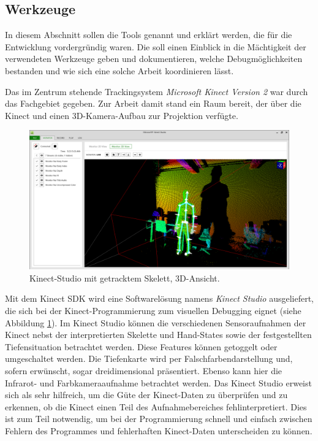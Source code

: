 	\subsection{Werkzeuge}
	In diesem Abschnitt sollen die Tools genannt und erklärt werden, die für die Entwicklung vordergründig waren. Die soll einen Einblick in die Mächtigkeit der verwendeten Werkzeuge geben und dokumentieren, welche Debugmöglichkeiten bestanden und wie sich eine solche Arbeit koordinieren lässt.\par
	Das im Zentrum stehende Trackingsystem \emph{Microsoft Kinect Version 2} war durch das Fachgebiet gegeben. Zur Arbeit damit stand ein Raum bereit, der über die Kinect und einen 3D-Kamera-Aufbau zur Projektion verfügte.\par 
		\begin{figure}[H]
	\centering
	\includegraphics[width=\textwidth]{pictures/3d.png}
	\caption{Kinect-Studio mit getracktem Skelett, 3D-Ansicht.}\label{fig:studio}
	\end{figure}
	Mit dem Kinect SDK wird eine Softwarelösung namens \emph{Kinect Studio} ausgeliefert, die sich bei der Kinect-Programmierung zum visuellen Debugging eignet (siehe Abbildung \ref{fig:studio}). Im Kinect Studio können die verschiedenen Sensoraufnahmen der Kinect nebst der interpretierten Skelette und Hand-States sowie der festgestellten Tiefensituation betrachtet werden. Diese Features können getoggelt oder umgeschaltet werden. Die Tiefenkarte wird per Falschfarbendarstellung und, sofern erwünscht, sogar dreidimensional präsentiert. Ebenso kann hier die Infrarot- und Farbkameraaufnahme betrachtet werden. Das Kinect Studio erweist sich als sehr hilfreich, um die Güte der Kinect-Daten zu überprüfen und zu erkennen, ob die Kinect einen Teil des Aufnahmebereiches fehlinterpretiert. Dies ist zum Teil notwendig, um bei der Programmierung schnell und einfach zwischen Fehlern des Programmes und fehlerhaften Kinect-Daten unterscheiden zu können.
